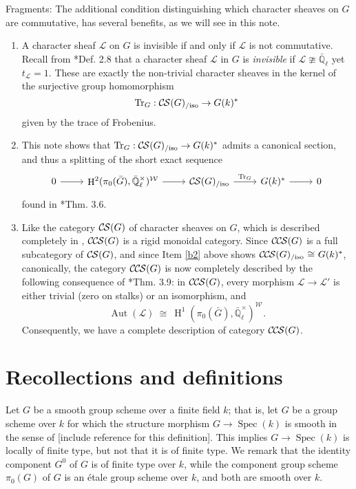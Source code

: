 \documentclass[10pt]{amsart}
\makeatletter
\theoremstyle{plain}
\theoremstyle{definition}
\newcommand{\EE}{\mathbb{\bar Q}_\ell}
\newcommand{\Fq}{k}
\newcommand{\EEx}{\EE^\times}
\newcommand{\Weil}[1]{\mathcal{W}_{#1}}
\DeclareMathOperator{\Aut}{Aut}
\DeclareMathOperator{\Hh}{H}
\newcommand{\Spec}[1]{{\operatorname{Spec}(#1)}}
\newcommand{\iso}{{\ \cong\ }}
\newcommand{\trFrob}[1]{t_{#1}}
\newcommand{\TrFrob}[1]{\operatorname{Tr}_{#1}}
\newcommand{\cs}[1]{{\mathcal{#1}}}
\newcommand{\CS}{{\mathcal{C\hskip-0.8pt S}}}
\newcommand{\CCS}{{\mathcal{C\hskip-.8pt C\hskip-0.8pt S}}}
\newcommand{\CSiso}[1]{\CS(#1)_{/\text{iso}}}
\newcommand{\CCSiso}[1]{\CCS(#1)_{/\text{iso}}}
\newcommand{\labitem}[2]{
\def\@itemlabel{\textbf{#1}}
\item
\def\@currentlabel{#1}\label{#2}}
\newcommand{\bG}{\bar{G}}
\makeatother
\begin{document}
Fragments: 
The additional condition distinguishing which character sheaves on $G$ are commutative, has several benefits, as we will see in this note.
\begin{enumerate}
\labitem{(1)}{b1}
A character sheaf $\cs{L}$ on $G$ is invisible if and only if $\cs{L}$ is not commutative.
Recall from \cite{cunningham-roe:13a}*{Def. 2.8} that a character sheaf $\cs{L}$ in $G$ is {\it invisible} if $\cs{L}  \ncong \EE$ yet $\trFrob{\cs{L}} =1$.
These are exactly the non-trivial character sheaves in the kernel of the surjective group homomorphism 
\[
\TrFrob{G} : \CSiso{G} \to G(\Fq)^*
\]
 given by the trace of Frobenius.
\labitem{(2)}{b2}
This note shows that $\TrFrob{G} : \CSiso{G} \to G(\Fq)^*$ admits a canonical section, and thus a splitting of the short exact sequence 
\[
\begin{tikzcd}
0 \arrow{r} & \Hh^2(\pi_0(\bG),\EEx)^{\Weil{}} \arrow{r} & \CSiso{G} \arrow{r}{\TrFrob{G}} & G(\Fq)^* \arrow{r} & 0
\end{tikzcd}
\]
found in \cite{cunningham-roe:13a}*{Thm. 3.6}.
\labitem{(3)}{b3}
Like the category $\CS(G)$ of character sheaves on $G$, which is described completely in \cite{cunningham-roe:13a}, $\CCS(G)$ is a rigid monoidal category.
Since $\CCS(G)$ is a full subcategory of $\CS(G)$, and since Item \ref{b2} above shows $\CCSiso{G} \iso G(\Fq)^*$, canonically, the category $\CCS(G)$ is now completely described by the following consequence of \cite{cunningham-roe:13a}*{Thm. 3.9}: in $\CCS(G)$, every morphism $\cs{L} \to \cs{L}'$ is either trivial (zero on stalks) or an isomorphism, and
\[
\Aut(\cs{L}) \iso  \Hh^1(\pi_0(\bG), \EEx)^{\Weil{}}.
\]
Consequently, we have a complete description of category $\CCS(G)$.
\end{enumerate}




\section{Recollections and definitions}

Let $G$ be a smooth group scheme over a finite field $\Fq$; that is, let $G$ be a group scheme over $\Fq$
for which the structure morphism $G \to \Spec{\Fq}$ is smooth in the sense of [include reference for this definition].
This implies $G \to \Spec{\Fq}$ is locally of finite type, but not that it is of finite type.
We remark that the identity component $G^0$ of $G$ is of finite type over $\Fq$, while the component group scheme
$\pi_0(G)$ of $G$ is an \'etale group scheme over $\Fq$, and both are smooth over $\Fq$.
\end{document}
